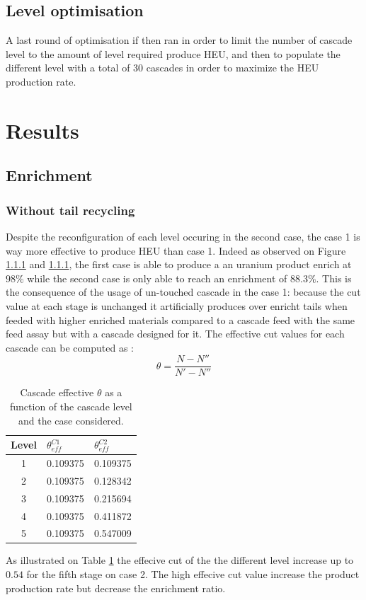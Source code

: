 \documentclass{anstrans}
\begin{document}
\subsection{Level optimisation}
A last round of optimisation if then ran in order to limit the number of cascade
level to the amount of level required produce HEU, and then to populate the
different level with a total of 30 cascades in order to maximize the HEU
production rate.

\section{Results}
\subsection{Enrichment}
\subsubsection{Without tail recycling}
Despite the reconfiguration of each level occuring in the second case, the case
1 is way more effective to produce HEU than case 1.
Indeed as observed on Figure \ref{} and \ref{}, the first case is able to
produce a an uranium product enrich at $98\%$ while the second case is only able
to reach an enrichment of $88.3\%$.
This is the consequence of the usage of un-touched cascade in the case 1:
because the cut value at each stage is unchanged it artificially produces over
enricht tails when feeded with higher enriched materials compared to a cascade
feed with the same feed assay but with a cascade designed for it.
The effective cut values for each cascade can be computed as :
\begin{equation}\label{eq:theta_eff}
    \theta = \dfrac{N - N''}{N'-N''}
\end{equation}

\begin{table}[htb]
\centering
\begin{tabular}{cll}
\toprule

Level   &  $\theta_{eff}^{C1}$   & $\theta_{eff}^{C2}$ \\
\midrule
1       & 0.109375               & 0.109375     \\
2       & 0.109375               & 0.128342     \\
3       & 0.109375               & 0.215694     \\
4       & 0.109375               & 0.411872     \\
5       & 0.109375               & 0.547009     \\

\bottomrule
\end{tabular}
  \caption{Cascade effective $\theta$ as a function of the cascade level and the
  case considered.}
  \label{tab:cascade_theta}
\end{table}
As illustrated on Table \ref{tab:cascade_theta} the effecive cut of the the
different level increase up to $0.54$ for the fifth stage on case 2. The high
effecive cut value increase the product production rate but decrease the
enrichment ratio.
\end{document}

